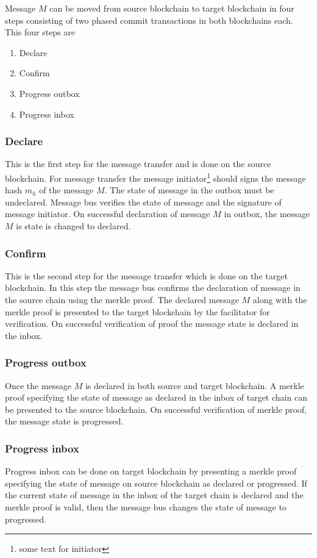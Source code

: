 \documentclass[12pt,a4paper]{article}
\begin{document}
Message $M$ can be moved from source blockchain to target blockchain in four steps consisting of two phased commit transactions in both blockchains each. 
This four steps are
\begin{enumerate}
\item Declare
\item Confirm
\item Progress outbox
\item Progress inbox
\end{enumerate}

\subsubsection{Declare}\label{gateway:declare}
This is the first step for the message transfer and is done on the source blockchain. 
For message transfer the message initiator\footnote{some text for initiator} should signs the message hash $m_h$ of the message $M$. 
The state of message in the outbox must be undeclared. 
Message bus verifies the state of message and the signature of message initiator. 
On successful declaration of message $M$ in outbox,  the message $M$ is state is changed to declared.

\subsubsection{Confirm}\label{gateway:confirm}
This is the second step for the message transfer which is done on the target blockchain. 
In this step the message bus confirms the declaration of message in the source chain using the merkle proof. 
The declared message $M$ along with the merkle proof is presented to the target blockchain by the facilitator for verification. 
On successful verification of proof the message state is declared in the inbox. 

\subsubsection{Progress outbox}\label{gateway:progressoutbox}
Once the message $M$ is declared in both source and target blockchain. 
A merkle proof specifying the state of message as declared in the inbox of target chain can be presented to the source blockchain. 
On successful verification of merkle proof, the message state is progressed.

\subsubsection{Progress inbox}\label{gateway:progressinbox}
 Progress inbox can be done on target blockchain by presenting a merkle proof specifying the state of message on source blockchain as declared or  progressed. 
 If the current state of message in the inbox of the target chain is declared and the merkle proof is valid, then the message bus changes the state of message to progressed.
 
\end{document}
